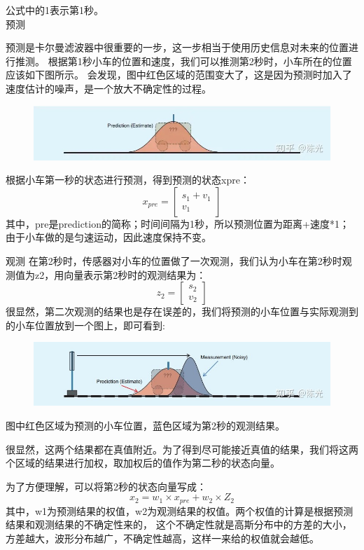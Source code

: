 \documentclass[12pt]{ctexart}
\begin{document}
公式中的1表示第1秒。
~\\
\textcolor{myblue}{预测}
\par
预测是卡尔曼滤波器中很重要的一步，这一步相当于使用历史信息对未来的位置进行推测。
根据第1秒小车的位置和速度，我们可以推测第2秒时，小车所在的位置应该如下图所示。
会发现，图中红色区域的范围变大了，这是因为预测时加入了速度估计的噪声，是一个放大不确定性的过程。
\begin{figure}[h]
    \centering
    \includegraphics[width = 12cm]{image/13.jpg}
\end{figure}
根据小车第一秒的状态进行预测，得到预测的状态xpre：
\[
    x_{pre}= 
    \left[
        \begin{matrix}
            s_1+v_1 \\
            v_1 
        \end{matrix}
    \right] \tag{2}
\]
其中，pre是prediction的简称；时间间隔为1秒，所以预测位置为距离+速度*1；由于小车做的是匀速运动，因此速度保持不变。

\textcolor{myblue}{观测}
在第2秒时，传感器对小车的位置做了一次观测，我们认为小车在第2秒时观测值为z2，用向量表示第2秒时的观测结果为：
\[
    z_2= 
    \left[
        \begin{matrix}
            s_2 \\
            v_2 
        \end{matrix}
    \right] \tag{2}
\]
很显然，第二次观测的结果也是存在误差的，我们将预测的小车位置与实际观测到的小车位置放到一个图上，即可看到:
\begin{figure}[h]
    \centering
    \includegraphics[width = 12cm]{image/14.jpg}
\end{figure}
图中红色区域为预测的小车位置，蓝色区域为第2秒的观测结果。

很显然，这两个结果都在真值附近。为了得到尽可能接近真值的结果，我们将这两个区域的结果进行加权，取加权后的值作为第二秒的状态向量。

为了方便理解，可以将第2秒的状态向量写成：
\[
x_2=w_1 \times x_{pre} +w_2\times Z_2  
\]
其中，w1为预测结果的权值，w2为观测结果的权值。两个权值的计算是根据预测结果和观测结果的不确定性来的，
这个不确定性就是高斯分布中的方差的大小，方差越大，波形分布越广，不确定性越高，这样一来给的权值就会越低。
\end{document}
